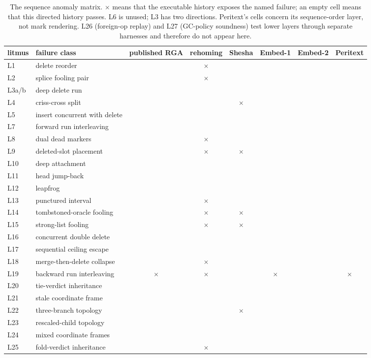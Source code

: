 \documentclass[11pt]{article}
\begin{document}
\begin{table}[p]
\centering
\scriptsize
\setlength{\tabcolsep}{3.2pt}
\begin{tabular}{@{}llcccccc@{}}
\toprule
litmus & failure class & published RGA & rehoming & Shesha & Embed-1 & Embed-2 & Peritext \\
\midrule
L1 & delete reorder                 &  & $\times$ &  &  &  &  \\
L2 & splice fooling pair            &  & $\times$ &  &  &  &  \\
L3a/b & deep delete run             &  &  &  &  &  &  \\
L4 & criss-cross split              &  &  & $\times$ &  &  &  \\
L5 & insert concurrent with delete  &  &  &  &  &  &  \\
L7 & forward run interleaving       &  &  &  &  &  &  \\
L8 & dual dead markers              &  & $\times$ &  &  &  &  \\
L9 & deleted-slot placement         &  & $\times$ & $\times$ &  &  &  \\
L10 & deep attachment               &  &  &  &  &  &  \\
L11 & head jump-back                &  &  &  &  &  &  \\
L12 & leapfrog                      &  &  &  &  &  &  \\
L13 & punctured interval            &  & $\times$ &  &  &  &  \\
L14 & tombstoned-oracle fooling     &  & $\times$ & $\times$ &  &  &  \\
L15 & strong-list fooling           &  & $\times$ & $\times$ &  &  &  \\
L16 & concurrent double delete      &  &  &  &  &  &  \\
L17 & sequential ceiling escape     &  &  &  &  &  &  \\
L18 & merge-then-delete collapse    &  & $\times$ &  &  &  &  \\
L19 & backward run interleaving     & $\times$ & $\times$ &  & $\times$ &  & $\times$ \\
L20 & tie-verdict inheritance       &  &  &  &  &  &  \\
L21 & stale coordinate frame        &  &  &  &  &  &  \\
L22 & three-branch topology         &  &  & $\times$ &  &  &  \\
L23 & rescaled-child topology       &  &  &  &  &  &  \\
L24 & mixed coordinate frames       &  &  &  &  &  &  \\
L25 & fold-verdict inheritance      &  & $\times$ &  &  &  &  \\
\bottomrule
\end{tabular}
\caption{The sequence anomaly matrix. $\times$ means that the executable
history exposes the named failure; an empty cell means that this directed
history passes. L6 is unused; L3 has two directions. Peritext's cells concern
its sequence-order layer, not mark rendering. L26 (foreign-op replay) and L27
(GC-policy soundness) test lower layers through separate harnesses and therefore
do not appear here.}
\label{tab:litmusmatrix}
\end{table}
\end{document}

